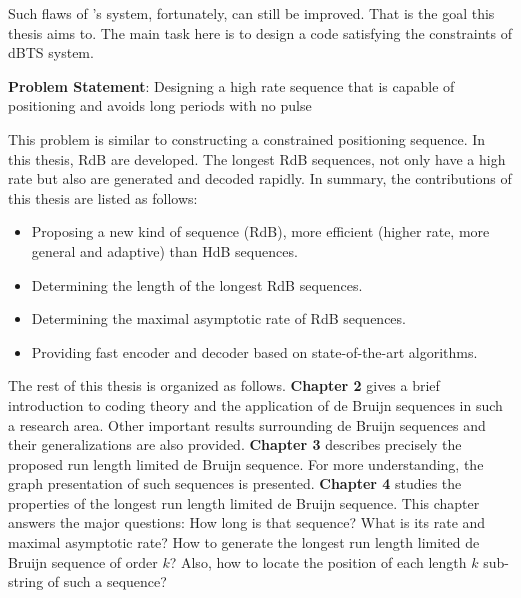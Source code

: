 Such flaws of \citeauthor{zhang2021timing}'s system, fortunately, can still be improved. That is the goal this thesis aims to. The main task here is to design a code satisfying the constraints of \gls{dBTS} system.

\textbf{Problem Statement}: Designing a high rate sequence that is capable of positioning and avoids long periods with no pulse

This problem is similar to constructing a constrained positioning sequence. In this thesis, \gls{RdB} are developed. The longest \gls{RdB} sequences, not only have a high rate but also are generated and decoded rapidly. In summary, the contributions of this thesis are listed as follows:
\begin{itemize}
    \item Proposing a new kind of sequence (\gls{RdB}), more efficient (higher rate, more general and adaptive) than \gls{HdB} sequences.
    \item Determining the length of the longest \gls{RdB} sequences.
    \item Determining the maximal asymptotic rate of \gls{RdB} sequences.
    \item Providing fast encoder and decoder based on state-of-the-art algorithms.
\end{itemize}

The rest of this thesis is organized as follows. \textbf{Chapter 2} gives a brief introduction to coding theory and the application of de Bruijn sequences in such a research area. Other important results surrounding de Bruijn sequences and their generalizations are also provided. \textbf{Chapter 3} describes precisely the proposed run length limited de Bruijn sequence. For more understanding, the graph presentation of such sequences is presented. \textbf{Chapter 4} studies the properties of the longest run length limited de Bruijn sequence. This chapter answers the major questions: How long is that sequence? What is its rate and maximal asymptotic rate? How to generate the longest run length limited de Bruijn sequence of order $k$? Also, how to locate the position of each length $k$ sub-string of such a sequence?



